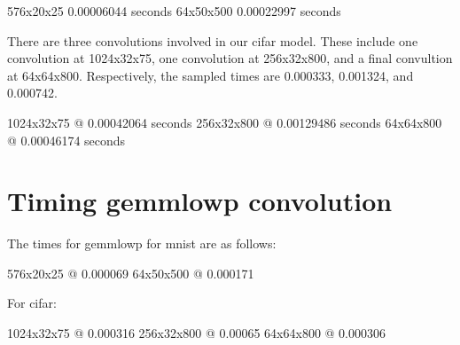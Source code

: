 \documentclass[12pt]{article}
\begin{document}
576x20x25	0.00006044 seconds
64x50x500	0.00022997 seconds

There are three convolutions involved in our cifar model. These include one convolution at 1024x32x75, one convolution at 256x32x800, and a final convultion at 64x64x800. Respectively, the sampled times are 0.000333, 0.001324, and 0.000742.

1024x32x75	@	0.00042064 seconds
256x32x800	@	0.00129486 seconds
64x64x800	@	0.00046174 seconds


\section{Timing gemmlowp convolution}
The times for gemmlowp for mnist are as follows:

576x20x25 @ 0.000069
64x50x500 @ 0.000171

For cifar: 

1024x32x75	@	0.000316
256x32x800	@	0.00065
64x64x800	@	0.000306






\begin{thebibliography}{10}
\end{thebibliography}
\end{document}
